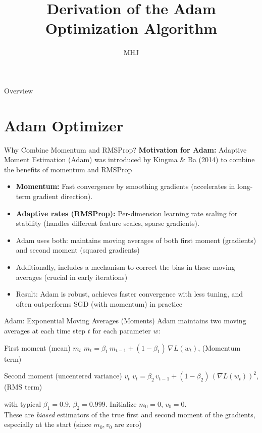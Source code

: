 \documentclass{beamer}
\title{Derivation of the Adam Optimization Algorithm}
\author{MHJ}
\institute{Notes 2018}
\date{}
\begin{document}
\begin{frame}
  \titlepage
\end{frame}

\begin{frame}{Overview}
  \tableofcontents
\end{frame}

\section{Adam Optimizer}

\begin{frame}{Why Combine Momentum and RMSProp?}
  \textbf{Motivation for Adam:} Adaptive Moment Estimation (Adam) was introduced by Kingma \& Ba (2014) to combine the benefits of momentum and RMSProp
  \begin{itemize}
    \item \textbf{Momentum:} Fast convergence by smoothing gradients (accelerates in long-term gradient direction).
    \item \textbf{Adaptive rates (RMSProp):} Per-dimension learning rate scaling for stability (handles different feature scales, sparse gradients).
    \item Adam uses both: maintains moving averages of both first moment (gradients) and second moment (squared gradients)
    \item Additionally, includes a mechanism to correct the bias in these moving averages (crucial in early iterations)
    \item Result: Adam is robust, achieves faster convergence with less tuning, and often outperforms SGD (with momentum) in practice
  \end{itemize}
\end{frame}

\begin{frame}{Adam: Exponential Moving Averages (Moments)}
  Adam maintains two moving averages at each time step $t$ for each parameter $w$:
  \begin{block}{First moment (mean) $m_t$}
    $m_t = \beta_1\, m_{t-1} + (1-\beta_1)\, \nabla L(w_t)$,  \quad (Momentum term) 
  \end{block}
  \begin{block}{Second moment (uncentered variance) $v_t$}
    $v_t = \beta_2\, v_{t-1} + (1-\beta_2)\, (\nabla L(w_t))^2$,  \quad (RMS term)
  \end{block}
  with typical $\beta_1 = 0.9$, $\beta_2 = 0.999$. Initialize $m_0 = 0$, $v_0 = 0$. \\
  \vspace{0.2cm}
  These are \alert{\textit{biased}} estimators of the true first and second moment of the gradients, especially at the start (since $m_0,v_0$ are zero)
\end{frame}
\end{document}
